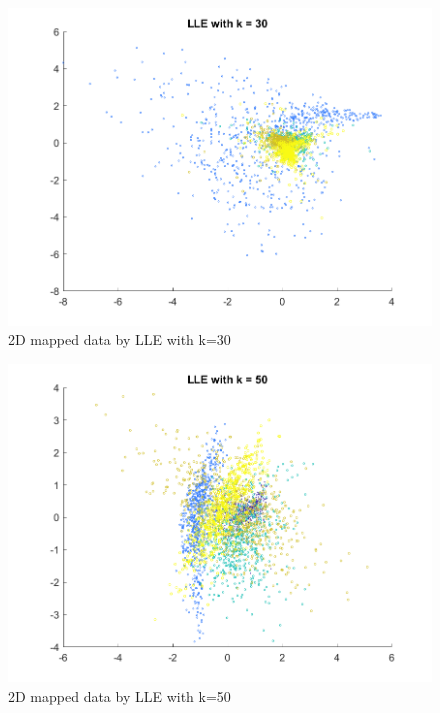 \documentclass{article}
\begin{document}
{    \begin{figure}[H]
        \centering
        \includegraphics[width = 0.8\linewidth]{Q2/LLE_30.png}
        \caption{2D mapped data by LLE with k=30}
    \end{figure}

    \begin{figure}[H]
        \centering
        \includegraphics[width = 0.8\linewidth]{Q2/LLE_50.png}
        \caption{2D mapped data by LLE with k=50}
    \end{figure}
}
\end{document}
